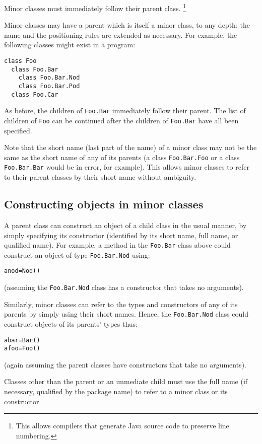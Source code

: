 Minor classes must immediately follow their parent class.
\footnote{
This allows compilers that generate Java source code to preserve line
numbering.
}
 
Minor classes may have a parent which is itself a minor class,
to any depth; the name and the positioning rules are extended as
necessary.  For example, the following classes might exist in a program:
\begin{lstlisting}
class Foo
  class Foo.Bar
    class Foo.Bar.Nod
    class Foo.Bar.Pod
  class Foo.Car
\end{lstlisting}
 
As before, the children of \texttt{Foo.Bar} immediately follow their
parent.  The list of children of \texttt{Foo} can be continued after
the children of \texttt{Foo.Bar} have all been specified.
 
Note that the short name (last part of the name) of a minor class may
not be the same as the short name of any of its parents (a
class \texttt{Foo.Bar.Foo} or a class \texttt{Foo.Bar.Bar} would be in
error, for example).  This allows minor classes to refer to their parent
classes by their short name without ambiguity.
\subsection{Constructing objects in minor classes}
 
A parent class can construct an object of a child class in the usual
manner, by simply specifying its constructor (identified by its short
name, full name, or qualified name).
For example, a method in the \texttt{Foo.Bar} class above could construct
an object of type \texttt{Foo.Bar.Nod} using:
\begin{lstlisting}
anod=Nod()
\end{lstlisting}
(assuming the \texttt{Foo.Bar.Nod} class has a constructor that takes no
arguments).
 
Similarly, minor classes can refer to the types and constructors of any
of its parents by simply using their short names.
Hence, the \texttt{Foo.Bar.Nod} class could construct objects of its
parents' types thus:
\begin{lstlisting}
abar=Bar()
afoo=Foo()
\end{lstlisting}
(again assuming the parent classes have constructors that take no
arguments).
 
Classes other than the parent or an immediate child must use the full
name (if necessary, qualified by the package name) to refer to a minor
class or its constructor.
